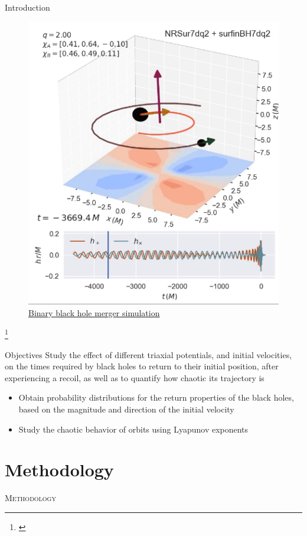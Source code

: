 \documentclass{beamer}
\newcommand\blfootnote[1]
{%
	\begingroup
	\renewcommand\thefootnote{}\footnote{#1}%
	\addtocounter{footnote}{-1}%
	\endgroup
}
\newcommand{\fcite}[1]{\blfootnote{\tiny\cite{#1}}}
\begin{document}
\begin{frame}{Introduction}
	\begin{figure}
		\centering
		\includegraphics[width=0.4\linewidth]{images/example}
		\caption{\href{run:/home/juan/Documents/TesisFisica/Slides/images/super_kick.mp4}{Binary black hole merger simulation}}
	\end{figure}
	
	\fcite{varma2018binary}
\end{frame}

\begin{frame}{Objectives}
	Study the effect of different triaxial potentials, and initial velocities, on the times required by black holes to return to their initial position, after experiencing a recoil, as well as to quantify how chaotic its trajectory is
	
	\begin{itemize}
		\item Obtain probability distributions for the return properties of the black holes, based on the magnitude and direction of the initial velocity
		\item Study the chaotic behavior of orbits using Lyapunov exponents
	\end{itemize}
\end{frame}

\section{Methodology}
\begin{frame}
	\centering
	\Huge
	\scshape
	Methodology
\end{frame}
\end{document}

